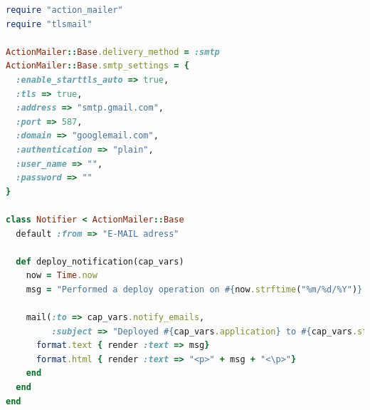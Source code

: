 \documentclass[12pt,             %
               a4paper,          %
               listof=totoc,     %
               index=totoc,      %
               bibliography=totoc,%
               oneside,         %
               BCOR1cm,          %
               english   %
               ]{scrbook}
\begin{document}
\clearpage
\begin{lstlisting}[language=Ruby, frame=single, caption=notify.rb, tabsize=2, flexiblecolumns=true, captionpos=b]
require "action_mailer"
require "tlsmail" 

ActionMailer::Base.delivery_method = :smtp
ActionMailer::Base.smtp_settings = {
  :enable_starttls_auto => true,
  :tls => true,
  :address => "smtp.gmail.com",
  :port => 587,
  :domain => "googlemail.com",
  :authentication => "plain",
  :user_name => "",
  :password => ""
}
 
class Notifier < ActionMailer::Base
  default :from => "E-MAIL adress"
  
  def deploy_notification(cap_vars)
    now = Time.now
    msg = "Performed a deploy operation on #{now.strftime("%m/%d/%Y")} at #{now.strftime("%I:%M %p")} to #{cap_vars.host}"
    
    mail(:to => cap_vars.notify_emails, 
         :subject => "Deployed #{cap_vars.application} to #{cap_vars.stage}") do |format|
      format.text { render :text => msg}
      format.html { render :text => "<p>" + msg + "<\p>"}
    end
  end
end
\end{lstlisting}\label{listing:capify_notify}
\end{document}
